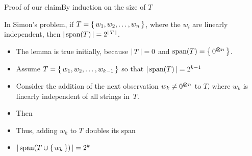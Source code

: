 \begin{frame}{Proof of our claim}{By induction on the size of $T$}

\begin{lemma}
In Simon's problem, if $T=\left\{\,w_{1}, w_{2},\ldots,w_{n}\,\right\}$, where the $w_{i}$ are linearly independent, then ${|\,{\mbox{span}(T)}\,|}=2^{{|\,T\,|}}$.
\end{lemma}
\begin{itemize}
    \item The lemma is true initially, because ${|\,T\,|}=0$ and ${\mbox{span}(T)}=\left\{\,0^{\bm{\otimes} n}\,\right\}$.
    \item Assume $T=\left\{\,w_{1},w_{2},\ldots,w_{k-1}\,\right\}$ so that ${|\,{\mbox{span}(T)}\,|}=2^{k-1}$
    \item Consider the addition of the next observation $w_{k}\not=0^{\bm{\otimes} n}$ to $T$, where $w_k$ is linearly independent of all strings in~$T$.
    \item Then 
    \item Thus, adding $w_{k}$ to $T$ doubles its span
    \item ${|\,{\mbox{span}(T \cup \left\{\,w_{k}\,\right\})}\,|}=2^k$ \QED{}
\end{itemize}
    
\end{frame}